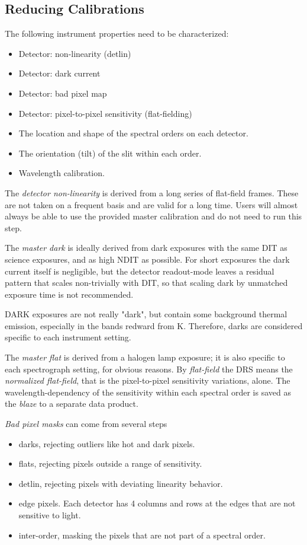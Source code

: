 
\subsection{Reducing Calibrations}
\label{sec:calib:reduc}

The following instrument properties need to be characterized:
\begin{itemize}
    \item Detector: non-linearity (detlin)
    \item Detector: dark current
    \item Detector: bad pixel map
    \item Detector: pixel-to-pixel sensitivity (flat-fielding)
    \item The location and shape of the spectral orders on each detector.
    \item The orientation (tilt) of the slit within each order.
    \item Wavelength calibration.
\end{itemize}

The \emph{detector non-linearity} is derived from a long series of flat-field
frames. These are not taken on a frequent basis and are valid for a long time.
Users will almost always be able to use the provided master calibration and do
not need to run this step.

The \emph{master dark} is ideally derived from dark exposures with the same DIT
as science exposures, and as high NDIT as possible. For short exposures the dark
current itself is negligible, but the detector readout-mode leaves a residual
pattern that scales non-trivially with DIT, so that scaling dark by unmatched
exposure time is not recommended.

DARK exposures are not really "dark", but contain some background thermal
emission, especially in the bands redward from K. Therefore, darks are
considered specific to each instrument setting.

The \emph{master flat} is derived from a halogen lamp exposure; it is also
specific to each spectrograph setting, for obvious reasons. By \emph{flat-field}
the DRS means the \emph{normalized flat-field}, that is the pixel-to-pixel
sensitivity variations, alone. The wavelength-dependency of the sensitivity
within each spectral order is saved as the \emph{blaze} to a separate data
product.

\emph{Bad pixel masks} can come from several steps
\begin{itemize}
    \item darks, rejecting outliers like hot and dark pixels.
    \item flats, rejecting pixels outside a range of sensitivity.
    \item detlin, rejecting pixels with deviating linearity behavior.
    \item edge pixels. Each detector has 4 columns and rows at the edges that
        are not sensitive to light.
    \item inter-order, masking the pixels that are not part of a spectral order.
\end{itemize}

